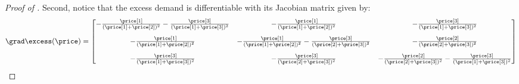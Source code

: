 \begin{proof}[Proof of ]
    Second, notice that the excess demand is differentiable with its Jacobian matrix given by:
    \begin{align*}
        \grad \excess(\price) = 
        \begin{bmatrix}
            -\frac{\price[1]}{(\price[1] + \price[2])^2} - \frac{\price[3]}{(\price[1] + \price[3])^2} 
            & -\frac{\price[1]}{(\price[1] + \price[2])^2} 
            & -\frac{\price[3]}{(\price[1] + \price[3])^2} \\[10pt]
            -\frac{\price[1]}{(\price[1] + \price[2])^2} 
            & -\frac{\price[1]}{(\price[1] + \price[2])^2} - \frac{\price[3]}{(\price[2] + \price[3])^2} 
            & -\frac{\price[2]}{(\price[2] + \price[3])^2} \\[10pt]
            -\frac{\price[3]}{(\price[1] + \price[3])^2} 
            & -\frac{\price[3]}{(\price[2] + \price[3])^2}
            & -\frac{\price[2]}{(\price[2] + \price[3])^2} - \frac{\price[3]}{(\price[1] + \price[3])^2}
        \end{bmatrix}      
    \end{align*}
    

\end{proof}

